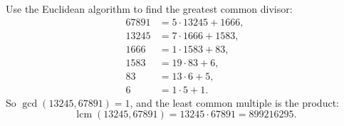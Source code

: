 Use the Euclidean algorithm to find the greatest common divisor:
\[
\begin{aligned}
67891&=5\cdot13245+1666,\\
13245&=7\cdot1666+1583,\\
1666&=1\cdot1583+83,\\
1583&=19\cdot83+6,\\
83&=13\cdot6+5,\\
6&=1\cdot5+1 .
\end{aligned}
\]
So $\gcd(13245,67891)=1$, and the least common multiple is the product:
\[
\operatorname{lcm}(13245,67891)=13245\cdot67891=\boxed{899216295}.
\]
